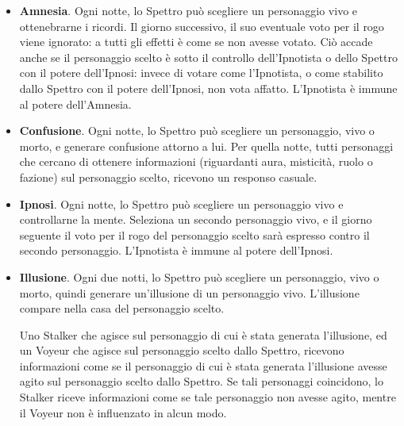\documentclass[a4paper,10pt]{article}
\begin{document}
\begin{itemize}
 \item {\bf Amnesia}. Ogni notte, lo Spettro può scegliere un personaggio vivo e ottenebrarne i ricordi. Il giorno successivo, il suo eventuale voto per il rogo viene ignorato: a tutti gli effetti è come se non avesse votato. Ciò accade anche se il personaggio scelto è sotto il controllo dell'Ipnotista o dello Spettro con il potere dell'Ipnosi: invece di votare come l'Ipnotista, o come stabilito dallo Spettro con il potere dell'Ipnosi, non vota affatto. L'Ipnotista è immune al potere dell'Amnesia. %
 
 
 \item {\bf Confusione}. Ogni notte, lo Spettro può scegliere un personaggio, vivo o morto, e generare confusione attorno a lui.
 Per quella notte, tutti personaggi che cercano di ottenere informazioni (riguardanti aura, misticità, ruolo o fazione) sul personaggio scelto, ricevono un responso casuale.
 
 \item{\bf Ipnosi}. Ogni notte, lo Spettro può scegliere un personaggio vivo e controllarne la mente. Seleziona un secondo personaggio vivo, e il giorno seguente il voto per il rogo del personaggio scelto sarà espresso contro il secondo personaggio. L'Ipnotista è immune al potere dell'Ipnosi. %


 \item {\bf Illusione}. Ogni due notti, lo Spettro può scegliere un personaggio, vivo o morto, quindi generare un'illusione di un personaggio vivo. L'illusione compare nella casa del personaggio scelto.
 
 Uno Stalker che agisce sul personaggio di cui è stata generata l'illusione, ed un Voyeur che agisce sul personaggio scelto dallo Spettro, ricevono informazioni come se il personaggio di cui è stata generata l'illusione avesse agito sul personaggio scelto dallo Spettro. Se tali personaggi coincidono, lo Stalker riceve informazioni come se tale personaggio non avesse agito, mentre il Voyeur non è influenzato in alcun modo.
 

\end{itemize}
\end{document}

